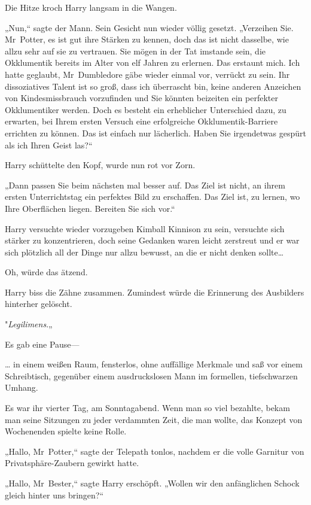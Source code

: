 {Die Hitze kroch Harry langsam in die Wangen.

„Nun,“ sagte der Mann. Sein Gesicht nun wieder völlig gesetzt. „Verzeihen Sie. Mr~Potter, es ist gut ihre Stärken zu kennen, doch das ist nicht dasselbe, wie allzu sehr auf sie zu vertrauen. Sie mögen in der Tat imstande sein, die Okklumentik bereits im Alter von elf Jahren zu erlernen. Das erstaunt mich. Ich hatte geglaubt, Mr~Dumbledore gäbe wieder einmal vor, verrückt zu sein. Ihr dissoziatives Talent ist so groß, dass ich überrascht bin, keine anderen Anzeichen von Kindesmissbrauch vorzufinden und Sie könnten beizeiten ein perfekter Okklumentiker werden. Doch es besteht ein erheblicher Unterschied dazu, zu erwarten, bei Ihrem ersten Versuch eine erfolgreiche Okklumentik-Barriere errichten zu können. Das ist einfach nur lächerlich. Haben Sie irgendetwas gespürt als ich Ihren Geist las?“

Harry schüttelte den Kopf, wurde nun rot vor Zorn.

„Dann passen Sie beim nächsten mal besser auf. Das Ziel ist nicht, an ihrem ersten Unterrichtstag ein perfektes Bild zu erschaffen. Das Ziel ist, zu lernen, wo Ihre Oberflächen liegen. Bereiten Sie sich vor.“

Harry versuchte wieder vorzugeben Kimball Kinnison zu sein, versuchte sich stärker zu konzentrieren, doch seine Gedanken waren leicht zerstreut und er war sich plötzlich all der Dinge nur allzu bewusst, an die er nicht denken sollte…

Oh, würde das ätzend.

Harry biss die Zähne zusammen. Zumindest würde die Erinnerung des Ausbilders hinterher gelöscht.

"\emph{Legilimens}.„

Es gab eine Pause—

\later

… in einem weißen Raum, fensterlos, ohne auffällige Merkmale und saß vor einem Schreibtisch, gegenüber einem ausdruckslosen Mann im formellen, tiefschwarzen Umhang.

Es war ihr vierter Tag, am Sonntagabend. Wenn man so viel bezahlte, bekam man seine Sitzungen zu jeder verdammten Zeit, die man wollte, das Konzept von Wochenenden spielte keine Rolle.

„Hallo, Mr~Potter,“ sagte der Telepath tonlos, nachdem er die volle Garnitur von Privatsphäre-Zaubern gewirkt hatte.

„Hallo, Mr~Bester,“ sagte Harry erschöpft. „Wollen wir den anfänglichen Schock gleich hinter uns bringen?“

}

